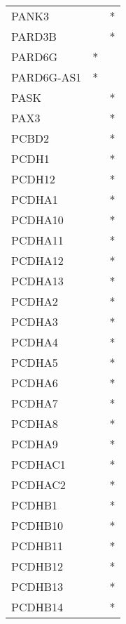 \begin{longtable}{lcc}
PANK3           &                &          * \\
PARD3B          &                &          * \\
PARD6G          &              * &            \\
PARD6G-AS1      &              * &            \\
PASK            &                &          * \\
PAX3            &                &          * \\
PCBD2           &                &          * \\
PCDH1           &                &          * \\
PCDH12          &                &          * \\
PCDHA1          &                &          * \\
PCDHA10         &                &          * \\
PCDHA11         &                &          * \\
PCDHA12         &                &          * \\
PCDHA13         &                &          * \\
PCDHA2          &                &          * \\
PCDHA3          &                &          * \\
PCDHA4          &                &          * \\
PCDHA5          &                &          * \\
PCDHA6          &                &          * \\
PCDHA7          &                &          * \\
PCDHA8          &                &          * \\
PCDHA9          &                &          * \\
PCDHAC1         &                &          * \\
PCDHAC2         &                &          * \\
PCDHB1          &                &          * \\
PCDHB10         &                &          * \\
PCDHB11         &                &          * \\
PCDHB12         &                &          * \\
PCDHB13         &                &          * \\
PCDHB14         &                &          * \\

\end{longtable}
